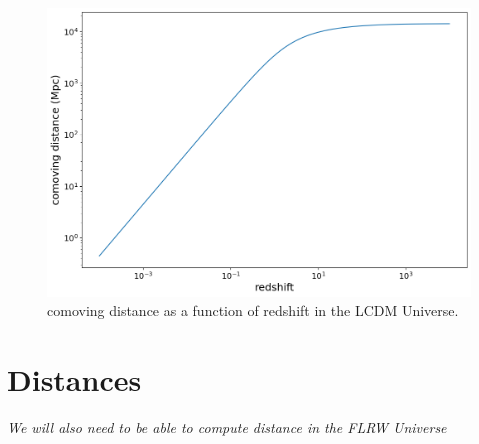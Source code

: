 \documentclass[a4paper, 11pt]{article}
\begin{document}
\begin{figure}
  \centering
  \includegraphics[width=0.7\columnwidth]{comoving_distance.png}
  \caption{comoving distance as a function of redshift in the LCDM Universe.}
  \label{fig:comov}
\end{figure}


\section{Distances}

{\it We will also need to be able to compute distance in the FLRW Universe}  \\
\end{document}
